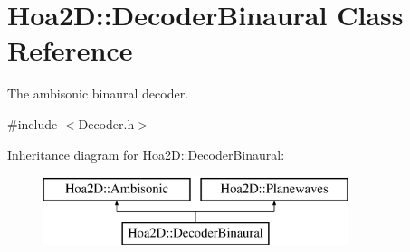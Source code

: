 \hypertarget{class_hoa2_d_1_1_decoder_binaural}{\section{Hoa2\-D\-:\-:Decoder\-Binaural Class Reference}
\label{class_hoa2_d_1_1_decoder_binaural}
}


The ambisonic binaural decoder.  




{\ttfamily \#include $<$Decoder.\-h$>$}

Inheritance diagram for Hoa2\-D\-:\-:Decoder\-Binaural\-:\begin{figure}[H]
\begin{center}
\leavevmode
\includegraphics[height=2.000000cm]{class_hoa2_d_1_1_decoder_binaural}
\end{center}
\end{figure}
